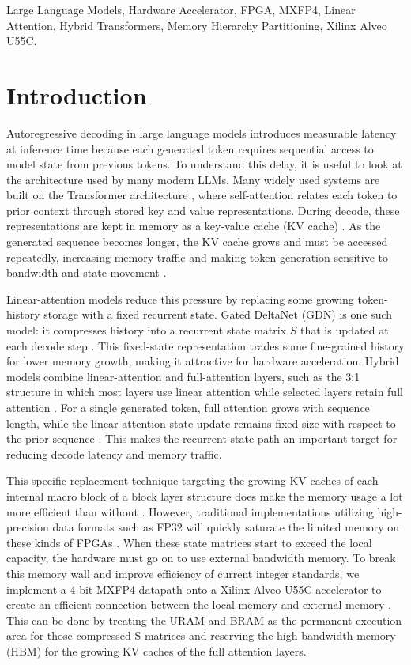﻿\documentclass[conference]{IEEEtran}
\begin{document}
\begin{IEEEkeywords}
Large Language Models, Hardware Accelerator, FPGA, MXFP4, Linear Attention, Hybrid Transformers, Memory Hierarchy Partitioning, Xilinx Alveo U55C.
\end{IEEEkeywords}

\section{Introduction}
Autoregressive decoding in large language models introduces measurable latency at inference time because each generated token requires sequential access to model state from previous tokens. To understand this delay, it is useful to look at the architecture used by many modern LLMs. Many widely used systems are built on the Transformer architecture \cite{b2}, where self-attention relates each token to prior context through stored key and value representations. During decode, these representations are kept in memory as a key-value cache (KV cache) \cite{b6}. As the generated sequence becomes longer, the KV cache grows and must be accessed repeatedly, increasing memory traffic and making token generation sensitive to bandwidth and state movement \cite{b7}.

Linear-attention models reduce this pressure by replacing some growing token-history storage with a fixed recurrent state. Gated DeltaNet (GDN) is one such model: it compresses history into a recurrent state matrix $S$ that is updated at each decode step \cite{b3}. This fixed-state representation trades some fine-grained history for lower memory growth, making it attractive for hardware acceleration. Hybrid models combine linear-attention and full-attention layers, such as the 3:1 structure in which most layers use linear attention while selected layers retain full attention \cite{b9}. For a single generated token, full attention grows with sequence length, while the linear-attention state update remains fixed-size with respect to the prior sequence \cite{b3}. This makes the recurrent-state path an important target for reducing decode latency and memory traffic.

This specific replacement technique targeting the growing KV caches of each internal macro block of a block layer structure does make the memory usage a lot more efficient than without \cite{b6}. However, traditional implementations utilizing high-precision data formats such as FP32 will quickly saturate the limited memory on these kinds of FPGAs \cite{b4}. When these state matrices start to exceed the local capacity, the hardware must go on to use external bandwidth memory. To break this memory wall and improve efficiency of current integer standards, we implement a 4-bit MXFP4 datapath onto a Xilinx Alveo U55C accelerator to create an efficient connection between the local memory and external memory \cite{b5}. This can be done by treating the URAM and BRAM as the permanent execution area for those compressed S matrices and reserving the high bandwidth memory (HBM) for the growing KV caches of the full attention layers.
\end{document}
